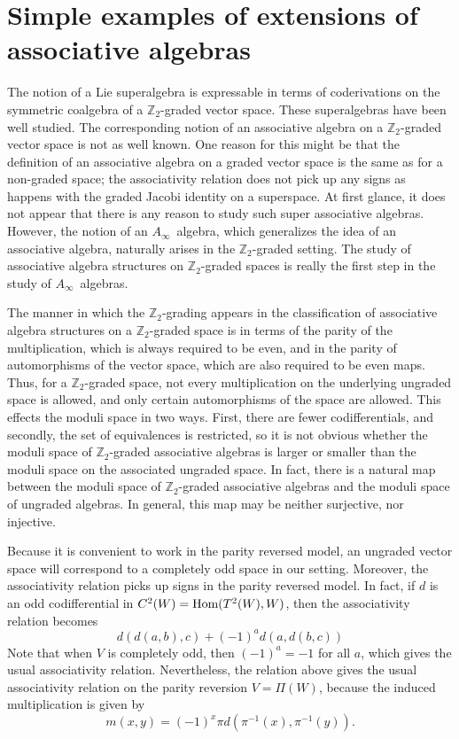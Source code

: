 \documentclass[12pt]{amsart}
\theoremstyle{definition}
\begin{document}
\section{Simple examples of extensions of associative
algebras}\label{sec8} The notion of a Lie superalgebra is
expressable in terms of coderivations on the symmetric coalgebra of
a {\mbox{${\mbox{$\mathbb Z$}}_2$}}-graded vector space. These superalgebras have been well
studied.  The corresponding notion of an associative algebra on a
{\mbox{${\mbox{$\mathbb Z$}}_2$}}-graded vector space is not as well known.  One reason for this
might be that the definition of an associative algebra on a graded
vector space is the same as for a non-graded space; the
associativity relation does not pick up any signs as happens with
the graded Jacobi identity on a superspace. At first glance, it does
not appear that there is any reason to study such super associative
algebras.  However, the notion of an {\mbox{$A_\infty$}}\ algebra, which
generalizes the idea of an associative algebra, naturally arises in
the {\mbox{${\mbox{$\mathbb Z$}}_2$}}-graded setting. The study of associative algebra structures
on {\mbox{${\mbox{$\mathbb Z$}}_2$}}-graded spaces is really the first step in the study of {\mbox{$A_\infty$}}\
algebras.

The manner in which the {\mbox{${\mbox{$\mathbb Z$}}_2$}}-grading appears in the classification of
associative algebra structures on a {\mbox{${\mbox{$\mathbb Z$}}_2$}}-graded space is in terms of
the parity of the multiplication, which is always required to be
even, and in the parity of automorphisms of the vector space, which
are also required to be even maps.  Thus, for a {\mbox{${\mbox{$\mathbb Z$}}_2$}}-graded space,
not every multiplication on the underlying ungraded space is
allowed, and only certain automorphisms of the space are allowed.
This effects  the moduli space in two ways. First, there are fewer
codifferentials, and secondly, the set of equivalences is
restricted, so it is not obvious whether the moduli space of
{\mbox{${\mbox{$\mathbb Z$}}_2$}}-graded associative algebras is larger or smaller than the moduli
space on the associated ungraded space. In fact, there is  a natural
map between the moduli space of {\mbox{${\mbox{$\mathbb Z$}}_2$}}-graded associative algebras and
the moduli space of ungraded algebras. In general, this map may be
neither surjective, nor injective.

Because it is convenient to work in the parity reversed model,
an ungraded vector space will correspond
to a completely odd space in our setting.
Moreover, the associativity relation picks up signs in the
parity reversed model.
In fact, if $d$ is an odd codifferential in $C^2(W)={\mbox{\rm Hom}}(T^2(W),W)$, then
the associativity relation becomes
\begin{equation}
d(d(a,b),c)+{(-1)^{{a}}}d(a,d(b,c))
\end{equation}
Note that when $V$ is completely odd, then ${(-1)^{{a}}}=-1$ for all $a$,
which gives the usual associativity relation.  Nevertheless, the
relation above gives the usual associativity relation on the parity
reversion $V=\Pi(W)$, because the induced multiplication is given by
$$m(x,y)={(-1)^{{x}}}\pi d(\pi{^{-1}}(x),\pi{^{-1}}(y)).$$
\end{document}
